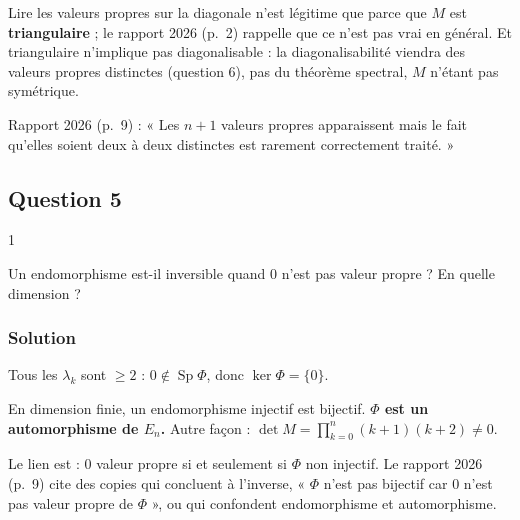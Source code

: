 \documentclass[11pt,a4paper]{article}
\begin{document}
\begin{piege}

Lire les valeurs propres sur la diagonale n'est légitime que parce que \(M\) est \textbf{triangulaire} ; le rapport 2026 (p.~2) rappelle que ce n'est pas vrai en général. Et triangulaire n'implique pas diagonalisable : la diagonalisabilité viendra des valeurs propres distinctes (question 6), pas du théorème spectral, \(M\) n'étant pas symétrique.

\end{piege}

\begin{jury}

Rapport 2026 (p.~9) : « Les \(n+1\) valeurs propres apparaissent mais le fait qu'elles soient deux à deux distinctes est rarement correctement traité. »

\end{jury}

\hypertarget{question-5-1}{%
\subsection{Question 5}\label{question-5-1}}

\begin{indication}{1}

Un endomorphisme est-il inversible quand \(0\) n'est pas valeur propre ? En quelle dimension ?

\end{indication}

\hypertarget{solution-24}{%
\subsubsection{Solution}\label{solution-24}}

Tous les \(\lambda_k\) sont \(\ge2\) : \(0\notin\operatorname{Sp}\Phi\), donc \(\ker\Phi=\{0\}\).

En dimension finie, un endomorphisme injectif est bijectif. \textbf{\(\Phi\) est un automorphisme de \(E_n\).} Autre façon : \(\det M=\prod_{k=0}^n(k+1)(k+2)\neq0\).

\begin{piege}

Le lien est : \(0\) valeur propre si et seulement si \(\Phi\) non injectif. Le rapport 2026 (p.~9) cite des copies qui concluent à l'inverse, « \(\Phi\) n'est pas bijectif car 0 n'est pas valeur propre de \(\Phi\) », ou qui confondent endomorphisme et automorphisme.

\end{piege}
\end{document}
